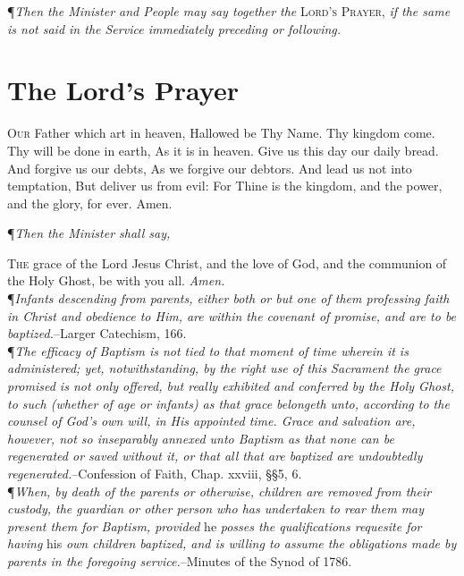 \noindent\P\textit{Then the Minister and People may say together the} \textsc{Lord's Prayer,} \textit{if the same is not said in the Service immediately preceding or following.}   

\section*{The Lord's Prayer}

\lettrine{O}{ur} Father which art in heaven, Hallowed be Thy Name.
Thy kingdom come.
Thy will be done in earth, As it is in heaven.
Give us this day our daily bread.
And forgive us our debts, As we forgive our debtors.
And lead us not into temptation, But deliver us from evil:
For Thine is the kingdom, and the power, and the glory, for ever.
Amen.

{\centering \P\textit{Then the Minister shall say,} \par} 
\vspace{1ex}

\lettrine{T}{he} grace of the Lord Jesus Christ, and the love of God, and the communion of the Holy Ghost, be with you all.
\textit{Amen.} \\ 

\noindent\P\textit{Infants descending from parents, either both or but one of them professing faith in Christ and obedience to Him, are within the covenant of promise, and are to be baptized.}--Larger Catechism, 166. \\ 

\noindent\P\textit{The efficacy of Baptism is not tied to that moment of time wherein it is administered; yet, notwithstanding, by the right use of this Sacrament the grace promised is not only offered, but really exhibited and conferred by the Holy Ghost, to such (whether of age or infants) as that grace belongeth unto, according to the counsel of God's own will, in His appointed time.
Grace and salvation are, however, not so inseparably annexed unto Baptism as that none can be regenerated or saved without it, or that all that are baptized are undoubtedly regenerated.}--Confession of Faith, Chap. xxviii, \S\S 5, 6. \\ 

\noindent\P\textit{When, by death of the parents or otherwise, children are removed from their custody, the guardian or other person who has undertaken to rear them may present them for Baptism, provided} he \textit{posses the qualifications requesite for having} his \textit{own children baptized, and is willing to assume the obligations made by parents in the foregoing service.}--Minutes of the Synod of 1786.   

